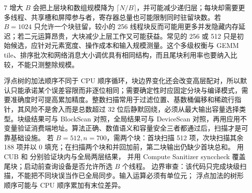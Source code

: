 \begin{solutionexercise}{7}
增大 $B$ 会把上层块和数组规模降为 $\lceil N/B\rceil$，并可能减少递归层；每块却需要更多线程、共享槽和屏障参与者，寄存器总量也可能限制同时驻留块数。若 $B=1024$ 只允许一个块驻留，较小的 256 线程块反而可能用更多并发隐藏内存延迟；若二元运算昂贵，大块减少上层工作又可能获益。常见的 256 或 512 只是初始候选，应针对元素宽度、操作成本和输入规模测量。这个多级权衡与 GEMM tile、排序批次和网络消息大小调优具有相同结构，而且尾块利用率也要纳入比较，不能只测整除规模。

浮点树的加法顺序不同于 CPU 顺序循环，块边界变化还会改变高层配对，所以默认只能承诺某个误差容限而非逐位相同；需要确定性时应固定分块与编译模式，需要准确度时可提高累加精度。整数扫描常用于过滤位置、基数桶偏移和稀疏行指针，其风险不是舍入而是总数超过 32 位后静默回绕，必须从最大输出容量选择类型。块级结果可与 BlockScan 对照，全局结果可与 DeviceScan 对照，再用应用不变量验证消费端地址。算法正确、数值语义和容量安全三者都通过后，扫描才是可靠基础设施。
\variantheading 若 $B=512,n=700$，需两个块：首块扫描 512 项，次块扫描其余 188 项并以
0 填充；在扫描两个块和并回加前，第二块输出仍缺少首块总和。
\practiceheading 用 CUB  和  分别验证块内与全局两层结果，
并用 Compute Sanitizer synccheck 覆盖尾块；启动前查询设备是否允许所选 $B$ 个线程。
边界审查：该代码只完成块级扫描，不能把不同块误当作已全局同步。输入运算必须有单位元；
浮点加法的树形顺序可能与 CPU 顺序累加有末位差异。
\end{solutionexercise}
